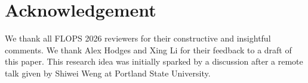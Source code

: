 \documentclass[runningheads]{llncs}
\begin{document}
  

  \section*{Acknowledgement}
  We thank all FLOPS 2026 reviewers for their constructive and insightful
  comments. We thank Alex Hodges and Xing Li for their feedback to a draft of
  this paper. This research idea was initially sparked by a discussion after a
  remote talk given by Shiwei Weng at Portland State University.

  
  

\fi

\newpage
\ifappendix
  
\fi
\end{document}
